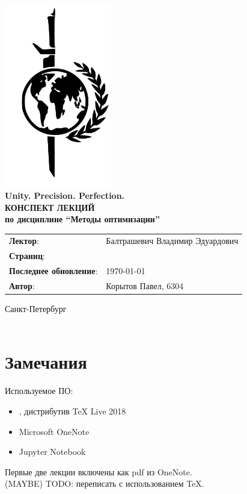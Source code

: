 \documentclass[a4paper, 14pt]{extarticle}
\numberwithin{equation}{section}
\begin{document}
	\begin{titlepage}
		{\centering
			{\bfseries
				\includegraphics[height=8cm]{logo.jpeg}\\
				Unity. Precision. Perfection.\\
				\vspace{3.5cm}
				\uppercase{Конспект лекций} \\
				по дисциплине \enquote{Методы оптимизации}\\
			}
			\vspace{\fill}
		}
		\begin{tabular}{l l}
			\textbf{Лектор}: & Балтрашевич Владимир Эдуардович\\
			\textbf{Страниц}: & \pageref{LastPage}\\
			\textbf{Последнее обновление}: & \today{}\\ 
			\textbf{Автор}: & Корытов Павел, 6304\\
		\end{tabular}
		
		\vspace{2cm}
		{\centering
			Санкт-Петербург \\
			\the\year\\
		}
	\end{titlepage}
	
	\tableofcontents
	\newpage
	\section*{Замечания}
	Используемое ПО:
	\begin{itemize}
		\item \XeLaTeX, дистрибутив TeX Live 2018
		\item Microsoft OneNote
		\item Jupyter Notebook
	\end{itemize}
	Первые две лекции включены как pdf из OneNote.\\
	(MAYBE) TODO: переписать с использованием \TeX. 
	
\end{document}
